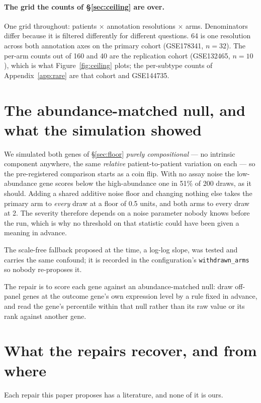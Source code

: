 \paragraph{The grid the counts of \S\ref{sec:ceiling} are over.} One grid
throughout: patients $\times$ annotation resolutions $\times$ arms. Denominators
differ because it is filtered differently for different questions. 64 is one
resolution across both annotation axes on the primary cohort (GSE178341,
$n = 32$). The per-arm counts out of 160 and 40 are the replication cohort
(GSE132465, $n = 10$), which is what Figure~\ref{fig:ceiling} plots; the
per-subtype counts of Appendix~\ref{app:rare} are that cohort and GSE144735.

\section{The abundance-matched null, and what the simulation showed}
\label{app:floor}

We simulated both genes of \S\ref{sec:floor} \emph{purely compositional} --- no
intrinsic component anywhere, the same \emph{relative} patient-to-patient
variation on each --- so the pre-registered comparison starts as a coin flip.
With no assay noise the low-abundance gene scores below the high-abundance one in
51\% of 200 draws, as it should. Adding a shared additive noise floor and
changing nothing else takes the primary arm to \emph{every} draw at a floor of
0.5 units, and both arms to every draw at 2. The severity therefore depends on a
noise parameter nobody knows before the run, which is why no threshold on that
statistic could have been given a meaning in advance.

The scale-free fallback proposed at the time, a log-log slope, was tested and
carries the same confound; it is recorded in the configuration's
\texttt{withdrawn\_arms} so nobody re-proposes it.

The repair is to score each gene against an abundance-matched null: draw
off-panel genes at the outcome gene's own expression level by a rule fixed in
advance, and read the gene's percentile within that null rather than its raw
value or its rank against another gene.

\section{What the repairs recover, and from where}
\label{app:priorart}

Each repair this paper proposes has a literature, and none of it is ours.

